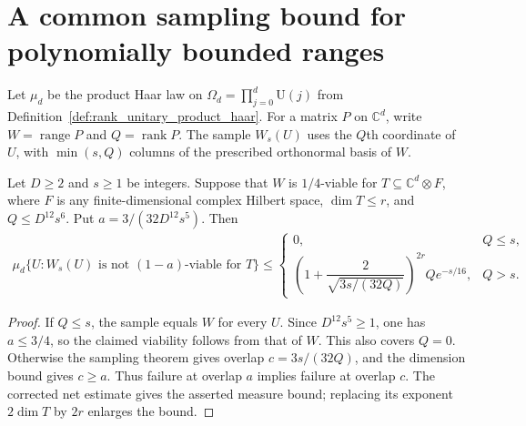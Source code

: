 \section{A common sampling bound for polynomially bounded ranges}

Let $\mu_d$ be the product Haar law on
$\Omega_d=\prod_{j=0}^d\mathrm U(j)$ from
Definition~\ref{def:rank_unitary_product_haar}. For a matrix $P$ on
$\mathbb C^d$, write $W=\operatorname{range}P$ and
$Q=\operatorname{rank}P$. The sample $W_s(U)$ uses the $Q$th
coordinate of $U$, with $\min(s,Q)$ columns of the prescribed
orthonormal basis of $W$.

\begin{theorem}
    \label{thm:polynomial_rank_sampling_failure}
    \leanok
    Let $D\ge2$ and $s\ge1$ be integers. Suppose that $W$ is
    $1/4$-viable for $T\subseteq\mathbb C^d\otimes F$, where $F$ is
    any finite-dimensional complex Hilbert space,
    $\dim T\le r$, and $Q\le D^{12}s^6$. Put
    $a=3/(32D^{12}s^5)$. Then
    \begin{align}
        \mu_d\{U:W_s(U)\text{ is not }(1-a)\text{-viable for }T\}
        \le
        \begin{cases}
            0,          & Q\le s, \\
            \left(1+\dfrac2{\sqrt{3s/(32Q)}}\right)^{2r}
            Qe^{-s/16}, & Q>s.
        \end{cases}
    \end{align}
\end{theorem}
\begin{proof}\leanok
    If $Q\le s$, the sample equals $W$ for every $U$.
    Since $D^{12}s^5\ge1$, one has $a\le3/4$, so the claimed
    viability follows from that of $W$. This also covers $Q=0$.
    Otherwise the sampling theorem gives overlap $c=3s/(32Q)$,
    and the dimension bound gives $c\ge a$.
    Thus failure at overlap $a$ implies failure at overlap $c$.
    The corrected net estimate gives the asserted measure bound;
    replacing its exponent $2\dim T$ by $2r$ enlarges the bound.
\end{proof}

